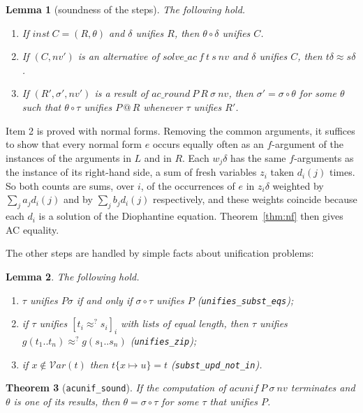 \documentclass[11pt,a4paper]{article}
\newtheorem{theorem}{Theorem}[section]
\newtheorem{lemma}[theorem]{Lemma}
\theoremstyle{definition}
\theoremstyle{remark}
\newcommand{\isa}[1]{\mbox{\small\texttt{#1}}}
\newcommand{\vars}{\mathcal{V}\mathit{ar}}
\newcommand{\eqAC}{\approx}
\begin{document}
\begin{lemma}[soundness of the steps]
  The following hold.
  \begin{enumerate}[nosep]
    \item If $\mathit{inst}\ C = (R, \theta)$ and $\delta$ unifies $R$, then $\theta\circ\delta$
          unifies $C$.
    \item If $(C, \mathit{nv}')$ is an alternative of $\mathit{solve\_ac}\ f\ t\ s\ \mathit{nv}$
          and $\delta$ unifies $C$, then $t\delta \eqAC s\delta$.
    \item If $(R', \sigma', \mathit{nv}')$ is a result of
          $\mathit{ac\_round}\ P\ R\ \sigma\ \mathit{nv}$, then $\sigma' = \sigma\circ\theta$ for
          some $\theta$ such that $\theta\circ\tau$ unifies $P \mathbin{@} R$ whenever $\tau$
          unifies $R'$.
  \end{enumerate}
\end{lemma}

Item 2 is proved with normal forms. Removing the common arguments, it suffices to show that
every normal form $e$ occurs equally often as an $f$-argument of the instances of the arguments in
$L$ and in $R$. Each $w_j\delta$ has the same $f$-arguments as the instance of its right-hand
side, a sum of fresh variables $z_i$ taken $d_i(j)$ times. So both counts are sums, over $i$, of
the occurrences of $e$ in $z_i\delta$ weighted by $\sum_{j} a_j d_i(j)$ and by
$\sum_{j} b_j d_i(j)$ respectively, and these weights coincide because each $d_i$ is a
solution of the Diophantine equation. Theorem~\ref{thm:nf} then gives AC equality.

The other steps are handled by simple facts about unification problems:
\begin{lemma}
  The following hold.
  \begin{enumerate}[nosep]
    \item $\tau$ unifies $P\sigma$ if and only if $\sigma\circ\tau$ unifies $P$
          (\isa{unifies\_subst\_eqs});
    \item if $\tau$ unifies $[t_i \approx^? s_i]_{i}$ with lists of equal length, then $\tau$
          unifies $g(t_1..t_n) \approx^? g(s_1..s_n)$ (\isa{unifies\_zip});
    \item if $x \notin \vars(t)$ then $t\{x \mapsto u\} = t$ (\isa{subst\_upd\_not\_in}).
  \end{enumerate}
\end{lemma}

\begin{theorem}[\isa{acunif\_sound}]
  If the computation of $\mathit{acunif}\ P\ \sigma\ \mathit{nv}$ terminates and
  $\theta$ is one of its results, then $\theta = \sigma\circ\tau$ for some $\tau$ that unifies
  $P$.
\end{theorem}
\end{document}
